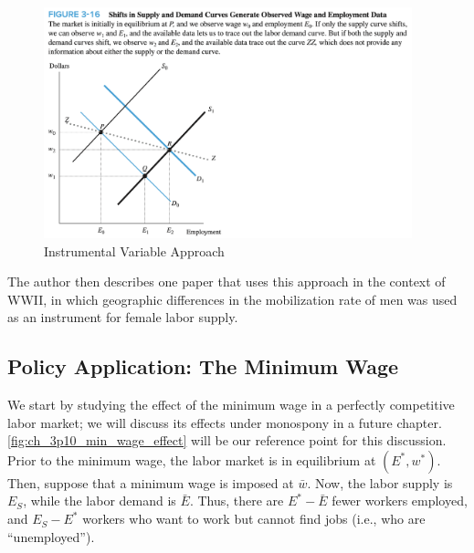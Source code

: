 \FloatBarrier

\begin{figure}[!htb]
    \centering
        \includegraphics[width=0.95\textwidth]{../input/ch_3p9_instrument_dem.png}
    \caption{Instrumental Variable Approach}
    \label{fig:ch_3p9_instrument_dem}
\end{figure}

\FloatBarrier

The author then describes one paper 
that uses this approach in the context of 
WWII, in which geographic differences in the 
mobilization rate of men was used as 
an instrument for female labor supply.

\subsection{Policy Application: The Minimum Wage}

We start by studying the effect of the 
minimum wage in a perfectly competitive labor market;
we will discuss its effects under monospony in a future 
chapter.
\autoref{fig:ch_3p10_min_wage_effect}
will be our reference point for this discussion. 
Prior to the minimum wage, 
the labor market is in equilibrium at
$(E^*, w^*)$. Then, suppose that a minimum wage
is imposed at $\bar{w}$. Now, the labor supply is 
$E_S$, while the labor demand is 
$\bar{E}$. Thus, there are 
$E^* - \bar{E}$ fewer workers employed,
and $E_S - E^*$ workers who want to work
but cannot find jobs (i.e., who are ``unemployed''). 

\FloatBarrier

